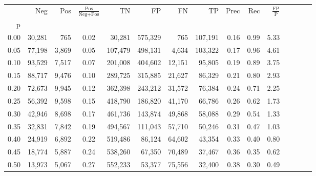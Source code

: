 \begin{tabular}{rrrcrrrrrrrrrrr}
\toprule
{} &     Neg &    Pos & $\frac{\text{Pos}}{\text{Neg}+\text{Pos}}$ &       TN &       FP &       FN &       TP &  Prec &   Rec & $\frac{\text{FP}}{\text{P}}$ \\
p    &         &        &                                            &          &          &          &          &       &       &                              \\
\midrule
0.00 &  30,281 &    765 &                                       0.02 &   30,281 &  575,329 &      765 &  107,191 &  0.16 &  0.99 &                         5.33 \\
0.05 &  77,198 &  3,869 &                                       0.05 &  107,479 &  498,131 &    4,634 &  103,322 &  0.17 &  0.96 &                         4.61 \\
0.10 &  93,529 &  7,517 &                                       0.07 &  201,008 &  404,602 &   12,151 &   95,805 &  0.19 &  0.89 &                         3.75 \\
0.15 &  88,717 &  9,476 &                                       0.10 &  289,725 &  315,885 &   21,627 &   86,329 &  0.21 &  0.80 &                         2.93 \\
0.20 &  72,673 &  9,945 &                                       0.12 &  362,398 &  243,212 &   31,572 &   76,384 &  0.24 &  0.71 &                         2.25 \\
0.25 &  56,392 &  9,598 &                                       0.15 &  418,790 &  186,820 &   41,170 &   66,786 &  0.26 &  0.62 &                         1.73 \\
0.30 &  42,946 &  8,698 &                                       0.17 &  461,736 &  143,874 &   49,868 &   58,088 &  0.29 &  0.54 &                         1.33 \\
0.35 &  32,831 &  7,842 &                                       0.19 &  494,567 &  111,043 &   57,710 &   50,246 &  0.31 &  0.47 &                         1.03 \\
0.40 &  24,919 &  6,892 &                                       0.22 &  519,486 &   86,124 &   64,602 &   43,354 &  0.33 &  0.40 &                         0.80 \\
0.45 &  18,774 &  5,887 &                                       0.24 &  538,260 &   67,350 &   70,489 &   37,467 &  0.36 &  0.35 &                         0.62 \\
0.50 &  13,973 &  5,067 &                                       0.27 &  552,233 &   53,377 &   75,556 &   32,400 &  0.38 &  0.30 &                         0.49 \\

\end{tabular}
